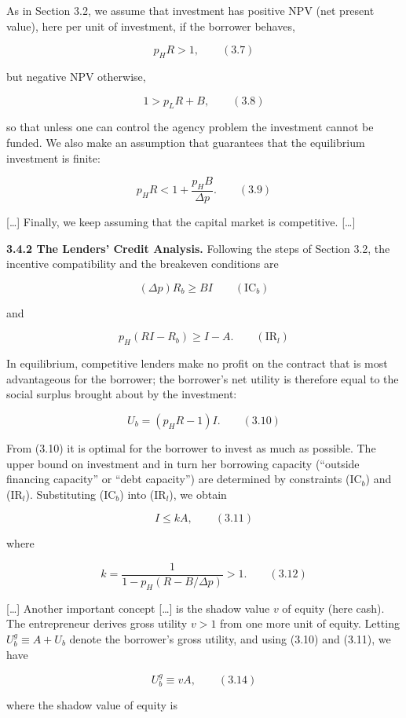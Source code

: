 \documentclass[11pt,a4paper]{article}
\begin{document}
As in Section 3.2, we assume that investment has positive NPV (net present value), here per unit of
investment, if the borrower behaves,

\[p_H R > 1, \qquad (3.7)\]

but negative NPV otherwise,

\[1 > p_L R + B, \qquad (3.8)\]

so that unless one can control the agency problem the investment cannot be funded. We also make an
assumption that guarantees that the equilibrium investment is finite:

\[p_H R < 1 + \frac{p_H B}{\Delta p}. \qquad (3.9)\]

{[}\ldots{]} Finally, we keep assuming that the capital market is competitive. {[}\ldots{]}

\textbf{3.4.2 The Lenders' Credit Analysis.} Following the steps of Section 3.2, the incentive
compatibility and the breakeven conditions are

\[(\Delta p) R_b \geqslant BI \qquad (\text{IC}_b)\]

and

\[p_H(RI - R_b) \geqslant I - A. \qquad (\text{IR}_l)\]

In equilibrium, competitive lenders make no profit on the contract that is most advantageous for the
borrower; the borrower's net utility is therefore equal to the social surplus brought about by the
investment:

\[U_b = (p_H R - 1)I. \qquad (3.10)\]

From (3.10) it is optimal for the borrower to invest as much as possible. The upper bound on
investment and in turn her borrowing capacity (``outside financing capacity'' or ``debt capacity'')
are determined by constraints (IC\(_b\)) and (IR\(_l\)). Substituting (IC\(_b\)) into (IR\(_l\)), we
obtain

\[I \leqslant kA, \qquad (3.11)\]

where

\[k = \frac{1}{1 - p_H(R - B/\Delta p)} > 1. \qquad (3.12)\]

{[}\ldots{]} Another important concept {[}\ldots{]} is the shadow value \(v\) of equity (here cash).
The entrepreneur derives gross utility \(v > 1\) from one more unit of equity. Letting
\(U_b^g \equiv A + U_b\) denote the borrower's gross utility, and using (3.10) and (3.11), we have

\[U_b^g \equiv vA, \qquad (3.14)\]

where the shadow value of equity is
\end{document}
